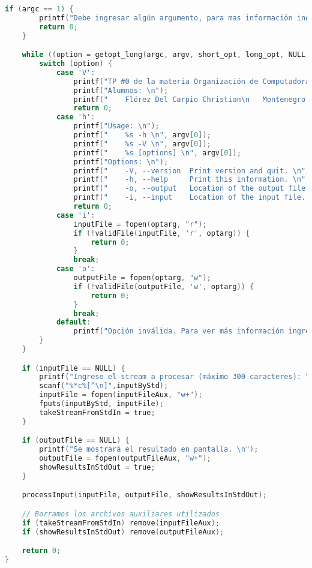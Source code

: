 \documentclass[a4paper]{article}
\begin{document}
\begin{lstlisting}[language=C]
    if (argc == 1) {
        printf("Debe ingresar algún argumento, para mas información ingrese -h \n");
        return 0;
    }

    while ((option = getopt_long(argc, argv, short_opt, long_opt, NULL)) != -1) {
        switch (option) {
            case 'V':
                printf("TP #0 de la materia Organización de Computadoras \n");
                printf("Alumnos: \n");
                printf("	Flórez Del Carpio Christian\n	Montenegro Josefina \n	Quino Lopez Julian \n");
                return 0;
            case 'h':
                printf("Usage: \n");
                printf("	%s -h \n", argv[0]);
                printf("	%s -V \n", argv[0]);
                printf("	%s [options] \n", argv[0]);
                printf("Options: \n");
                printf("	-V, --version  Print version and quit. \n");
                printf("	-h, --help     Print this information. \n");
                printf("	-o, --output   Location of the output file. \n");
                printf("	-i, --input    Location of the input file. \n");
                return 0;
            case 'i':
                inputFile = fopen(optarg, "r");
                if (!validFile(inputFile, 'r', optarg)) {
                    return 0;
                }
                break;
            case 'o':
                outputFile = fopen(optarg, "w");
                if (!validFile(outputFile, 'w', optarg)) {
                    return 0;
                }
                break;
            default:
                printf("Opción inválida. Para ver más información ingrese -h. \n");
        }
    }

    if (inputFile == NULL) {
        printf("Ingrese el stream a procesar (máximo 300 caracteres): \n");
        scanf("%*c%[^\n]",inputByStd);
        inputFile = fopen(inputFileAux, "w+");
        fputs(inputByStd, inputFile);
        takeStreamFromStdIn = true;
    }

    if (outputFile == NULL) {
        printf("Se mostrará el resultado en pantalla. \n");
        outputFile = fopen(outputFileAux, "w+");
        showResultsInStdOut = true;
    }

    processInput(inputFile, outputFile, showResultsInStdOut);

    // Borramos los archivos auxiliares utilizados
    if (takeStreamFromStdIn) remove(inputFileAux);
    if (showResultsInStdOut) remove(outputFileAux);

    return 0;
}
\end{lstlisting}
\end{document}
